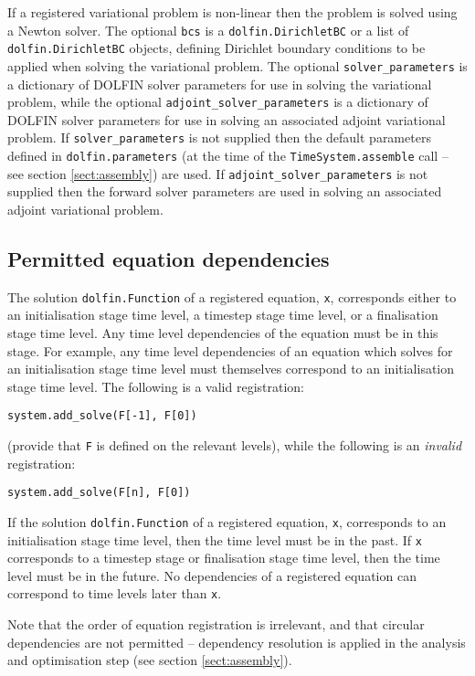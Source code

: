 \documentclass[a4paper]{book}
\begin{document}
If a registered variational problem is non-linear then the problem is solved
using a Newton solver. The optional \verb+bcs+ is a \verb+dolfin.DirichletBC+ or
a list of \verb+dolfin.DirichletBC+ objects, defining Dirichlet boundary
conditions to be applied when solving the variational problem. The optional
\verb+solver_parameters+ is a dictionary of DOLFIN solver parameters for use in
solving the variational problem, while the optional
\verb+adjoint_solver_parameters+ is a dictionary of DOLFIN solver parameters for
use in solving an associated adjoint variational problem. If
\verb+solver_parameters+ is not supplied then the default parameters defined in
\verb+dolfin.parameters+ (at the time of the \verb+TimeSystem.assemble+ call --
see section \ref{sect:assembly}) are used. If \verb+adjoint_solver_parameters+
is not supplied then the forward solver parameters are used in solving an
associated adjoint variational problem.

\subsection{Permitted equation dependencies}

The solution \verb+dolfin.Function+ of a registered equation, \verb+x+,
corresponds either to an initialisation stage time level, a timestep stage time
level, or a finalisation stage time level. Any time level dependencies of the
equation must be in this stage. For example, any time level dependencies of an
equation which solves for an initialisation stage time level must themselves
correspond to an initialisation stage time level. The following is a valid
registration:
\begin{lstlisting}
system.add_solve(F[-1], F[0])
\end{lstlisting}
(provide that \verb+F+ is defined on the relevant levels), while the following
is an \emph{invalid} registration:
\begin{lstlisting}
system.add_solve(F[n], F[0])
\end{lstlisting}

If the solution \verb+dolfin.Function+ of a registered equation, \verb+x+,
corresponds to an initialisation stage time level, then the time level must be
in the past. If \verb+x+ corresponds to a timestep stage or finalisation stage
time level, then the time level must be in the future. No dependencies of a
registered equation can correspond to time levels later than \verb+x+.

Note that the order of equation registration is irrelevant, and that
circular dependencies are not permitted -- dependency resolution is applied in
the analysis and optimisation step (see section \ref{sect:assembly}).
\end{document}
